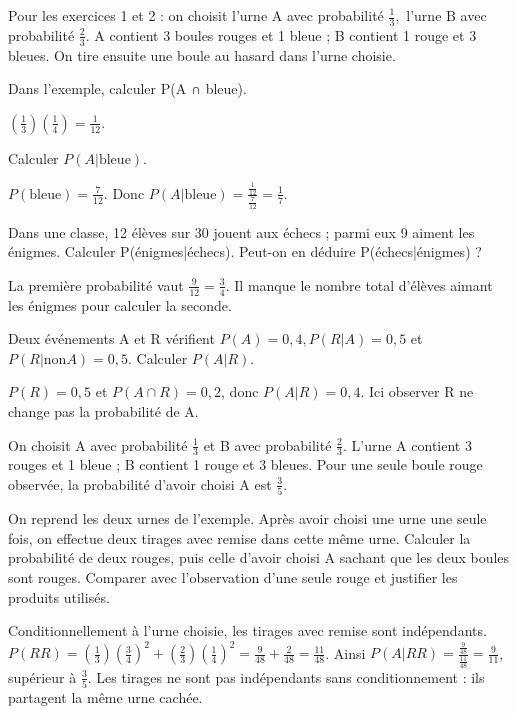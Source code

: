 \documentclass[11pt]{article}
\begin{document}
Pour les exercices 1 et 2 : on choisit l’urne A avec probabilité \(\frac{1}{3},\) l’urne B avec probabilité \(\frac{2}{3}\). A contient 3 boules rouges et 1 bleue ; B contient 1 rouge et 3 bleues. On tire ensuite une boule au hasard dans l’urne choisie.\par
{}
Dans l’exemple, calculer P(A ∩ bleue).\par
\((\frac{1}{3})(\frac{1}{4}) = \frac{1}{12}\).\par
{}
Calculer \(P(A|\mathrm{bleue})\).\par
\(P(\mathrm{bleue}) = \frac{7}{12}\). Donc \(P(A|\mathrm{bleue}) = \frac{\frac{1}{12}}{\frac{7}{12}} = \frac{1}{7}\).\par
{}
Dans une classe, 12 élèves sur 30 jouent aux échecs ; parmi eux 9 aiment les énigmes. Calculer P(énigmes|échecs). Peut-on en déduire P(échecs|énigmes) ?\par
La première probabilité vaut \(\frac{9}{12} = \frac{3}{4}\). Il manque le nombre total d’élèves aimant les énigmes pour calculer la seconde.\par
{}
Deux événements A et R vérifient \(P(A)=0,4, P(R|A)=0,5\) et \(P(R|\mathrm{non} A)=0,5\). Calculer \(P(A|R)\).\par
\(P(R)=0,5\) et \(P(A \cap  R)=0,2\), donc \(P(A|R)=0,4\). Ici observer R ne change pas la probabilité de A.\par
{}
On choisit A avec probabilité \(\frac{1}{3}\) et B avec probabilité \(\frac{2}{3}\). L’urne A contient 3 rouges et 1 bleue ; B contient 1 rouge et 3 bleues. Pour une seule boule rouge observée, la probabilité d’avoir choisi A est \(\frac{3}{5}\).\par
On reprend les deux urnes de l’exemple. Après avoir choisi une urne une seule fois, on effectue deux tirages avec remise dans cette même urne. Calculer la probabilité de deux rouges, puis celle d’avoir choisi A sachant que les deux boules sont rouges. Comparer avec l’observation d’une seule rouge et justifier les produits utilisés.\par
Conditionnellement à l’urne choisie, les tirages avec remise sont indépendants. \(P(RR) = (\frac{1}{3})(\frac{3}{4})^{2} + (\frac{2}{3})(\frac{1}{4})^{2} = \frac{9}{48} + \frac{2}{48} = \frac{11}{48}\). Ainsi \(P(A|RR) = \frac{\frac{9}{48}}{\frac{11}{48}} = \frac{9}{11}\), supérieur à \(\frac{3}{5}\). Les tirages ne sont pas indépendants sans conditionnement : ils partagent la même urne cachée.\par
\end{document}
